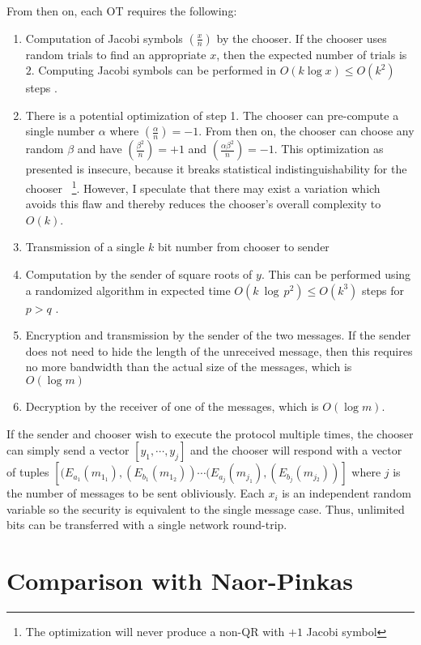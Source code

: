 From then on, each OT requires the following: 
\begin{enumerate}
\item Computation of Jacobi symbols $\left(\frac{x}{n}\right)$ by the chooser.
If the chooser uses random trials to find an appropriate $x$, then
the expected number of trials is $2$. Computing Jacobi symbols can
be performed in $O(k\log x)\le O(k^{2})$ steps \cite{1996-bach-book}. 
\item There is a potential optimization of step 1. The chooser can pre-compute
a single number $\alpha$ where $\left(\frac{\alpha}{n}\right)=-1$.
From then on, the chooser can choose any random $\beta$ and have
$\left(\frac{\beta^{2}}{n}\right)=+1$ and $\left(\frac{\alpha\beta^{2}}{n}\right)=-1$.
This optimization as presented is insecure, because it breaks statistical
indistinguishability for the chooser~%
\footnote{The optimization will never produce a non-QR with $+1$ Jacobi symbol%
}. However, I speculate that there may exist a variation which avoids
this flaw and thereby reduces the chooser's overall complexity to
$O(k)$.
\item Transmission of a single $k$ bit number from chooser to sender
\item Computation by the sender of square roots of $y$. This can be performed
using a randomized algorithm in expected time $O(k\ \log\, p^{2})\le O(k^{3})$
steps for $p>q$ \cite{1996-bach-book}. 
\item Encryption and transmission by the sender of the two messages. If
the sender does not need to hide the length of the unreceived message,
then this requires no more bandwidth than the actual size of the messages,
which is $O(\log m)$
\item Decryption by the receiver of one of the messages, which is $O(\log m)$.
\end{enumerate}
If the sender and chooser wish to execute the protocol multiple times,
the chooser can simply send a vector $[y_{1},\cdots,y_{j}]$ and the
chooser will respond with a vector of tuples $[(E_{a_{1}}(m_{1_{1}}),(E_{b_{1}}(m_{1_{2}}))\cdots(E_{a_{j}}(m_{j_{1}}),(E_{b_{j}}(m_{j{}_{2}}))]$
where $j$ is the number of messages to be sent obliviously. Each
$x_{i}$ is an independent random variable so the security is equivalent
to the single message case. Thus, unlimited bits can be transferred
with a single network round-trip.


\section{Comparison with Naor-Pinkas\label{sub:Comparison-with-Naor-Pinkas}}

